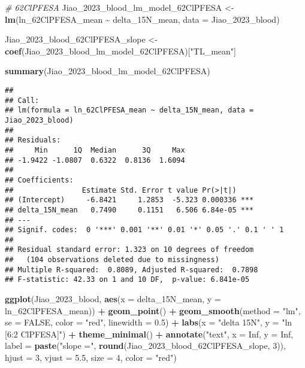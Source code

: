 \documentclass[
]{article}
\newenvironment{Shaded}{\begin{snugshade}}{\end{snugshade}}
\newcommand{\AttributeTok}[1]{\textcolor[rgb]{0.13,0.29,0.53}{#1}}
\newcommand{\CommentTok}[1]{\textcolor[rgb]{0.56,0.35,0.01}{\textit{#1}}}
\newcommand{\ConstantTok}[1]{\textcolor[rgb]{0.56,0.35,0.01}{#1}}
\newcommand{\DecValTok}[1]{\textcolor[rgb]{0.00,0.00,0.81}{#1}}
\newcommand{\FloatTok}[1]{\textcolor[rgb]{0.00,0.00,0.81}{#1}}
\newcommand{\FunctionTok}[1]{\textcolor[rgb]{0.13,0.29,0.53}{\textbf{#1}}}
\newcommand{\NormalTok}[1]{#1}
\newcommand{\OtherTok}[1]{\textcolor[rgb]{0.56,0.35,0.01}{#1}}
\newcommand{\SpecialCharTok}[1]{\textcolor[rgb]{0.81,0.36,0.00}{\textbf{#1}}}
\newcommand{\StringTok}[1]{\textcolor[rgb]{0.31,0.60,0.02}{#1}}
\begin{document}
\begin{Shaded}
\begin{Highlighting}[]
\CommentTok{\# 62ClPFESA}
\NormalTok{Jiao\_2023\_blood\_lm\_model\_62ClPFESA }\OtherTok{\textless{}{-}} \FunctionTok{lm}\NormalTok{(ln\_62ClPFESA\_mean }\SpecialCharTok{\textasciitilde{}}\NormalTok{ delta\_15N\_mean,}
                                    \AttributeTok{data =}\NormalTok{ Jiao\_2023\_blood)}

\NormalTok{Jiao\_2023\_blood\_62ClPFESA\_slope }\OtherTok{\textless{}{-}} \FunctionTok{coef}\NormalTok{(Jiao\_2023\_blood\_lm\_model\_62ClPFESA)[}\StringTok{"TL\_mean"}\NormalTok{]}

\FunctionTok{summary}\NormalTok{(Jiao\_2023\_blood\_lm\_model\_62ClPFESA)}
\end{Highlighting}
\end{Shaded}

\begin{verbatim}
## 
## Call:
## lm(formula = ln_62ClPFESA_mean ~ delta_15N_mean, data = Jiao_2023_blood)
## 
## Residuals:
##     Min      1Q  Median      3Q     Max 
## -1.9422 -1.0807  0.6322  0.8136  1.6094 
## 
## Coefficients:
##                Estimate Std. Error t value Pr(>|t|)    
## (Intercept)     -6.8421     1.2853  -5.323 0.000336 ***
## delta_15N_mean   0.7490     0.1151   6.506 6.84e-05 ***
## ---
## Signif. codes:  0 '***' 0.001 '**' 0.01 '*' 0.05 '.' 0.1 ' ' 1
## 
## Residual standard error: 1.323 on 10 degrees of freedom
##   (104 observations deleted due to missingness)
## Multiple R-squared:  0.8089, Adjusted R-squared:  0.7898 
## F-statistic: 42.33 on 1 and 10 DF,  p-value: 6.841e-05
\end{verbatim}

\begin{Shaded}
\begin{Highlighting}[]
\FunctionTok{ggplot}\NormalTok{(Jiao\_2023\_blood, }\FunctionTok{aes}\NormalTok{(}\AttributeTok{x =}\NormalTok{ delta\_15N\_mean, }\AttributeTok{y =}\NormalTok{ ln\_62ClPFESA\_mean)) }\SpecialCharTok{+}
  \FunctionTok{geom\_point}\NormalTok{() }\SpecialCharTok{+}
  \FunctionTok{geom\_smooth}\NormalTok{(}\AttributeTok{method =} \StringTok{"lm"}\NormalTok{, }\AttributeTok{se =} \ConstantTok{FALSE}\NormalTok{, }\AttributeTok{color =} \StringTok{"red"}\NormalTok{, }\AttributeTok{linewidth =} \FloatTok{0.5}\NormalTok{) }\SpecialCharTok{+}
  \FunctionTok{labs}\NormalTok{(}\AttributeTok{x =} \StringTok{"delta 15N"}\NormalTok{,}
       \AttributeTok{y =} \StringTok{"ln [6:2 ClPFESA]"}\NormalTok{) }\SpecialCharTok{+}
  \FunctionTok{theme\_minimal}\NormalTok{() }\SpecialCharTok{+}
  \FunctionTok{annotate}\NormalTok{(}\StringTok{"text"}\NormalTok{, }\AttributeTok{x =} \ConstantTok{Inf}\NormalTok{, }\AttributeTok{y =} \ConstantTok{Inf}\NormalTok{, }\AttributeTok{label =} \FunctionTok{paste}\NormalTok{(}\StringTok{"slope ="}\NormalTok{, }\FunctionTok{round}\NormalTok{(Jiao\_2023\_blood\_62ClPFESA\_slope, }\DecValTok{3}\NormalTok{)), }
           \AttributeTok{hjust =} \DecValTok{3}\NormalTok{, }\AttributeTok{vjust =} \FloatTok{5.5}\NormalTok{, }\AttributeTok{size =} \DecValTok{4}\NormalTok{, }\AttributeTok{color =} \StringTok{"red"}\NormalTok{)}
\end{Highlighting}
\end{Shaded}
\end{document}

